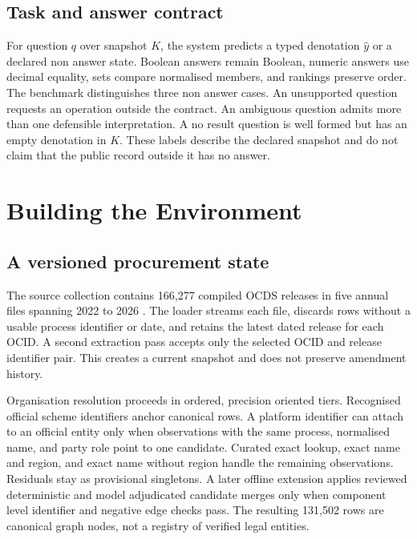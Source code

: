 \documentclass{article}
\begin{document}
\subsection{Task and answer contract}

For question $q$ over snapshot $K$, the system predicts a typed denotation $\hat y$ or a declared
non answer state.  Boolean answers remain Boolean, numeric answers use decimal equality, sets
compare normalised members, and rankings preserve order.  The benchmark distinguishes three non
answer cases.  An unsupported question requests an operation outside the contract.  An ambiguous
question admits more than one defensible interpretation.  A no result question is well formed but
has an empty denotation in $K$.  These labels describe the declared snapshot and do not claim that
the public record outside it has no answer.

\section{Building the Environment}
\label{sec:building}

\subsection{A versioned procurement state}

The source collection contains 166,277 compiled OCDS releases in five annual files spanning 2022
to 2026 \citep{ocds}.  The loader streams each file, discards rows without a usable process
identifier or date, and retains the latest dated release for each OCID.  A second extraction pass
accepts only the selected OCID and release identifier pair.  This creates a current snapshot and
does not preserve amendment history.

Organisation resolution proceeds in ordered, precision oriented tiers.  Recognised official
scheme identifiers anchor canonical rows.  A platform identifier can attach to an official entity
only when observations with the same process, normalised name, and party role point to one
candidate.  Curated exact lookup, exact name and region, and exact name without region handle the
remaining observations.  Residuals stay as provisional singletons.  A later offline extension
applies reviewed deterministic and model adjudicated candidate merges only when component level
identifier and negative edge checks pass.  The resulting 131,502 rows are canonical graph nodes,
not a registry of verified legal entities.
\end{document}
